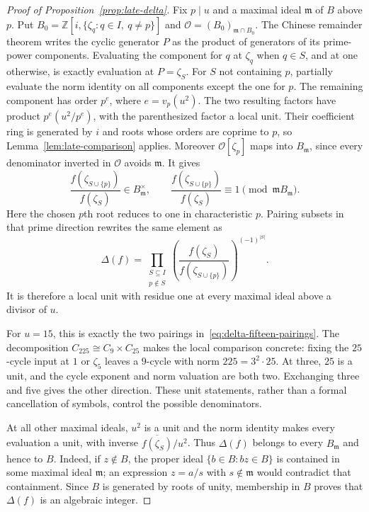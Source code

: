 \documentclass[11pt]{article}
\begin{document}
\begin{proof}[Proof of Proposition~\ref{prop:late-delta}]
Fix $p\mid u$ and a maximal ideal $\mathfrak m$ of $B$ above $p$.
Put $B_{0}=\mathbb Z[i,\{\zeta_{q}:q\in I,\ q\ne p\}]$ and
$\mathcal O={(B_{0})}_{\mathfrak m\cap B_{0}}$.
The Chinese remainder theorem writes the cyclic generator $P$ as the
product of generators of its prime-power components. Evaluating the
component for $q$ at $\zeta_{q}$ when $q\in S$, and at one otherwise,
is exactly evaluation at $P=\zeta_{S}$.
For $S$ not containing $p$, partially evaluate the norm identity on
all components except the one for $p$. The remaining component has order
$p^{e}$, where $e=v_{p}(u^{2})$. The two resulting factors have product
$p^{e}(u^{2}/p^{e})$, with the parenthesized factor a local unit. Their
coefficient ring is generated by $i$ and roots whose orders are
coprime to $p$, so Lemma~\ref{lem:late-comparison} applies.
Moreover $\mathcal O[\zeta_{p}]$ maps into $B_{\mathfrak m}$, since
every denominator inverted in $\mathcal O$ avoids $\mathfrak m$.
It gives
\begin{equation}
 \frac{f(\zeta_{S\cup\{p\}})}{f(\zeta_{S})}
 \in B_{\mathfrak m}^{\times},\qquad
 \frac{f(\zeta_{S\cup\{p\}})}{f(\zeta_{S})}
 \equiv1\pmod{\mathfrak mB_{\mathfrak m}}.%
 \label{eq:late-local-ratio}
\end{equation}
Here the chosen $p$th root reduces to one in characteristic $p$.
Pairing subsets in that prime direction rewrites the same element as
\[
 \Delta(f)=\prod_{\substack{S\subseteq I\\p\notin S}}
 {\left(\frac{f(\zeta_{S})}{f(\zeta_{S\cup\{p\}})}\right)}^{{(-1)}^{|S|}}.
\]
It is therefore a local unit with residue one at every maximal ideal
above a divisor of $u$.

For $u=15$, this is exactly the two pairings
in~\eqref{eq:delta-fifteen-pairings}. The decomposition
$C_{225}\cong C_9\times C_{25}$ makes the local comparison concrete:
fixing the $25$-cycle input at $1$ or $\zeta_5$ leaves a $9$-cycle with
norm $225=3^2\cdot25$. At three, $25$ is a unit, and the cycle exponent
and norm valuation are both two. Exchanging three and five gives the
other direction. These unit statements, rather than a formal cancellation
of symbols, control the possible denominators.

At all other maximal ideals, $u^{2}$ is a unit and the norm identity
makes every evaluation a unit, with inverse
$\overline{f(\zeta_{S})}/u^{2}$. Thus $\Delta(f)$ belongs to every
$B_{\mathfrak m}$ and hence to $B$. Indeed, if $z\notin B$, the
proper ideal $\{b\in B:bz\in B\}$ is contained in some maximal
ideal $\mathfrak m$; an expression $z=a/s$ with $s\notin\mathfrak m$
would contradict that containment. Since $B$ is generated by roots of
unity, membership in $B$ proves that $\Delta(f)$ is an algebraic integer.


\end{proof}
\end{document}
